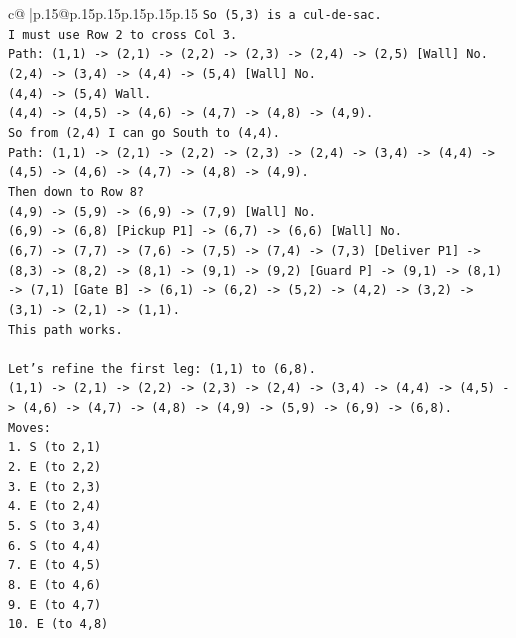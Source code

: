 \documentclass{article}
\begin{document}
{\begin{supertabular}{c@{$\;$}|p{.15\linewidth}@{}p{.15\linewidth}p{.15\linewidth}p{.15\linewidth}p{.15\linewidth}p{.15\linewidth}}
{{{\texttt{So (5,3) is a cul{-}de{-}sac.} \\
\texttt{I must use Row 2 to cross Col 3.} \\
\texttt{Path: (1,1) {-}> (2,1) {-}> (2,2) {-}> (2,3) {-}> (2,4) {-}> (2,5) {[}Wall{]} No.} \\
\texttt{(2,4) {-}> (3,4) {-}> (4,4) {-}> (5,4) {[}Wall{]} No.} \\
\texttt{(4,4) {-}> (5,4) Wall.} \\
\texttt{(4,4) {-}> (4,5) {-}> (4,6) {-}> (4,7) {-}> (4,8) {-}> (4,9).} \\
\texttt{So from (2,4) I can go South to (4,4).} \\
\texttt{Path: (1,1) {-}> (2,1) {-}> (2,2) {-}> (2,3) {-}> (2,4) {-}> (3,4) {-}> (4,4) {-}> (4,5) {-}> (4,6) {-}> (4,7) {-}> (4,8) {-}> (4,9).} \\
\texttt{Then down to Row 8?} \\
\texttt{(4,9) {-}> (5,9) {-}> (6,9) {-}> (7,9) {[}Wall{]} No.} \\
\texttt{(6,9) {-}> (6,8) {[}Pickup P1{]} {-}> (6,7) {-}> (6,6) {[}Wall{]} No.} \\
\texttt{(6,7) {-}> (7,7) {-}> (7,6) {-}> (7,5) {-}> (7,4) {-}> (7,3) {[}Deliver P1{]} {-}> (8,3) {-}> (8,2) {-}> (8,1) {-}> (9,1) {-}> (9,2) {[}Guard P{]} {-}> (9,1) {-}> (8,1) {-}> (7,1) {[}Gate B{]} {-}> (6,1) {-}> (6,2) {-}> (5,2) {-}> (4,2) {-}> (3,2) {-}> (3,1) {-}> (2,1) {-}> (1,1).} \\
\texttt{This path works.} \\
\\ 
\texttt{Let's refine the first leg: (1,1) to (6,8).} \\
\texttt{(1,1) {-}> (2,1) {-}> (2,2) {-}> (2,3) {-}> (2,4) {-}> (3,4) {-}> (4,4) {-}> (4,5) {-}> (4,6) {-}> (4,7) {-}> (4,8) {-}> (4,9) {-}> (5,9) {-}> (6,9) {-}> (6,8).} \\
\texttt{Moves:} \\
\texttt{1. S (to 2,1)} \\
\texttt{2. E (to 2,2)} \\
\texttt{3. E (to 2,3)} \\
\texttt{4. E (to 2,4)} \\
\texttt{5. S (to 3,4)} \\
\texttt{6. S (to 4,4)} \\
\texttt{7. E (to 4,5)} \\
\texttt{8. E (to 4,6)} \\
\texttt{9. E (to 4,7)} \\
\texttt{10. E (to 4,8)} \\
}}}
\end{supertabular}}
\end{document}

